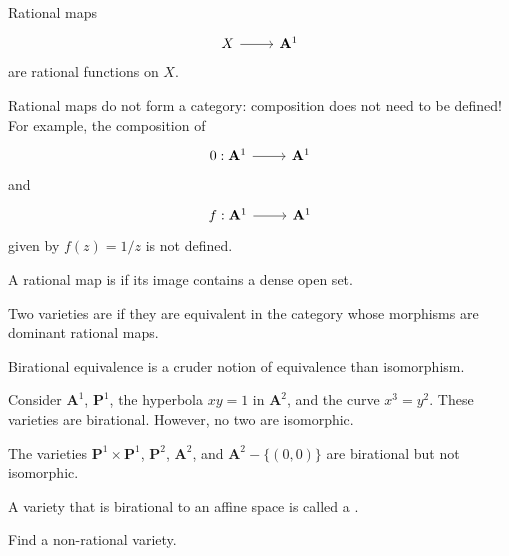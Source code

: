 \documentclass [11 pt, oneside] {article}
\begin{document}
\begin{example}[ ]\label{}
Rational maps 
\[
\begin{tikzcd}
X\ar[r]& \mathbf{A}^1
\end{tikzcd}
\]
are rational functions on $X$.
\end{example}

Rational maps do not form a category: composition does not need to be defined! 
For example, the composition of 
\[
\begin{tikzcd}
0:\mathbf{A}^1\ar[r]& \mathbf{A}^1
\end{tikzcd}
\] 
and 
\[
\begin{tikzcd}
f:\mathbf{A}^1\ar[r]& \mathbf{A}^1
\end{tikzcd}
\]
given by $f(z)= 1/z$ is not defined.

\begin{definition}[ ]\label{}
A rational map is  if its image contains a dense open set.
\end{definition}

\begin{definition}
	Two varieties are  if they are equivalent in the category whose morphisms are dominant rational maps.
\end{definition}

\begin{remark}
	Birational equivalence is a cruder notion of equivalence than isomorphism.
\end{remark}

\begin{example}[ ]\label{}
Consider $\mathbf{A}^1$, $\mathbf{P}^1 $, the hyperbola $xy=1$ in $\mathbf{A}^2$, and the curve $x^3=y^2$. These varieties are birational. However, no two are isomorphic.

The varieties $\mathbf{P}^1\times \mathbf{P}^1$, $\mathbf{P}^2$, $\mathbf{A}^2$, and $\mathbf{A}^2-\{(0,0)\}$ are birational but not isomorphic.
\end{example}

\begin{remark}
	A variety that is birational to an affine space is called a .
\end{remark}

\begin{problem}
	Find a non-rational variety.
\end{problem}
\end{document}
